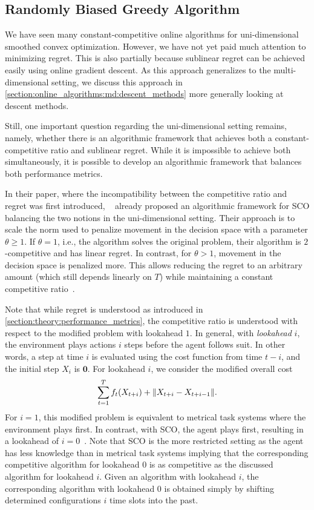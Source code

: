 \subsection{Randomly Biased Greedy Algorithm}\label{section:online_algorithms:ud:rbg}

We have seen many constant-competitive online algorithms for uni-dimensional smoothed convex optimization. However, we have not yet paid much attention to minimizing regret. This is also partially because sublinear regret can be achieved easily using online gradient descent. As this approach generalizes to the multi-dimensional setting, we discuss this approach in \cref{section:online_algorithms:md:descent_methods} more generally looking at descent methods.

Still, one important question regarding the uni-dimensional setting remains, namely, whether there is an algorithmic framework that achieves both a constant-competitive ratio and sublinear regret. While it is impossible to achieve both simultaneously, it is possible to develop an algorithmic framework that balances both performance metrics.

In their paper, where the incompatibility between the competitive ratio and regret was first introduced, \citeauthor*{Andrew2015}~\cite{Andrew2015} already proposed an algorithmic framework for SCO balancing the two notions in the uni-dimensional setting. Their approach is to scale the norm used to penalize movement in the decision space with a parameter $\theta \geq 1$. If $\theta = 1$, i.e., the algorithm solves the original problem, their algorithm is $2$-competitive and has linear regret. In contrast, for $\theta > 1$, movement in the decision space is penalized more. This allows reducing the regret to an arbitrary amount (which still depends linearly on $T$) while maintaining a constant competitive ratio~\cite{Andrew2015}.

Note that while regret is understood as introduced in \cref{section:theory:performance_metrics}, the competitive ratio is understood with respect to the modified problem with lookahead $1$. In general, with \emph{lookahead} $i$, the environment plays actions $i$ steps before the agent follows suit. In other words, a step at time $i$ is evaluated using the cost function from time $t-i$, and the initial step $X_i$ is $\mathbf{0}$. For lookahead $i$, we consider the modified overall cost \begin{align*}
    \sum_{t=1}^T f_t(X_{t+i}) + \lVert X_{t+i} - X_{t+i-1}\rVert.
\end{align*} For $i=1$, this modified problem is equivalent to metrical task systems where the environment plays first. In contrast, with SCO, the agent plays first, resulting in a lookahead of $i=0$~\cite{Andrew2015}. Note that SCO is the more restricted setting as the agent has less knowledge than in metrical task systems implying that the corresponding competitive algorithm for lookahead $0$ is as competitive as the discussed algorithm for lookahead $i$. Given an algorithm with lookahead $i$, the corresponding algorithm with lookahead $0$ is obtained simply by shifting determined configurations $i$ time slots into the past.

